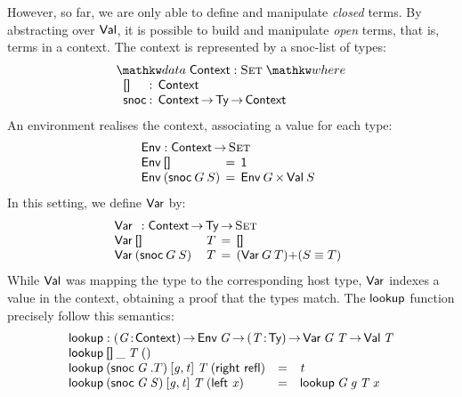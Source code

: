 \newcommand{\Ctxt}{\D{Context}}
\newcommand{\SYMBCtxtEmpty}{\C{[]}\xspace}
\newcommand{\CtxtEmpty}{\SYMBCtxtEmpty}
\newcommand{\SYMBCtxtSnoc}{\C{snoc}\xspace}
\newcommand{\CtxtSnoc}[2]{\SYMBCtxtSnoc\:#1\:#2}
\newcommand{\SYMBEnv}{\F{Env}}
\newcommand{\Env}[1]{\SYMBEnv\: #1}
\newcommand{\SYMBlookup}{\F{lookup}}
\newcommand{\lookup}[4]{\SYMBlookup\: #1\: #2\: #3\: #4}

However, so far, we are only able to define and manipulate
\emph{closed} terms. By abstracting over $\SYMBVal$, it is possible to
build and manipulate \emph{open} terms, that is, terms in a
context. The context is represented by a snoc-list of types:
%
\[
\stk{
\data \Ctxt : \Set \where \\
\;\;\begin{array}{@{}l@{\::\:\:}l@{\quad}l}
    \SYMBCtxtEmpty  & \Ctxt   \\
    \SYMBCtxtSnoc   & \Ctxt \To \Ty \To \Ctxt
\end{array}
}\]
%
An environment realises the context, associating a value for each type:
%
\[
\stk{
\SYMBEnv : \Ctxt \To \Set \\
\begin{array}{@{}l@{\:\:=\:\:}l}
\Env{\CtxtEmpty}        & \Unit \\
\Env{(\CtxtSnoc{G}{S})} & \TIMES{\Env{G}}{\Val{S}}
\end{array}
}\]
%
In this setting, we define $\SYMBVar$ by:
%
\[\stk{
\Var{}{} : \Ctxt \To \Ty \To \Set \\
\begin{array}{@{}ll@{\:\:=\:\:}l}
\Var{\CtxtEmpty}{& T}            & \Void \\
\Var{(\CtxtSnoc{G}{S})}{& T}     & \SUM{(\Var{G}{T})}{(S \Eq T)}
\end{array}
}\]
%
While $\SYMBVal$ was mapping the type to the corresponding host type,
$\SYMBVar$ indexes a value in the context, obtaining a proof that the
types match. The $\SYMBlookup$ function precisely follow this
semantics:
%
\[\stk{
\SYMBlookup : \PI{\V{G}}{\Ctxt} 
          \Env{\V{G}} \To 
          \PI{\V{T}}{\Ty} 
          \Var{\V{G}}{\V{T}} \To
          \Val{\V{T}} \\
\begin{array}{@{}lll}
\lookup{\CtxtEmpty}{               \_}{                   \V{T}}{()}                    &   & \\
\lookup{(\CtxtSnoc{\V{G}}{.T})}{   \pair{\V{g}}{\V{t}}{}}{\V{T}}{(\SumRight{\C{refl}})} & = & \V{t} \\
\lookup{(\CtxtSnoc{\V{G}}{\V{S}})}{\pair{\V{g}}{\V{t}}{}}{\V{T}}{(\SumLeft{\V{x}})}     & = & \lookup{\V{G}}{\V{g}}{\V{T}}{\V{x}} 
\end{array}
}\]

